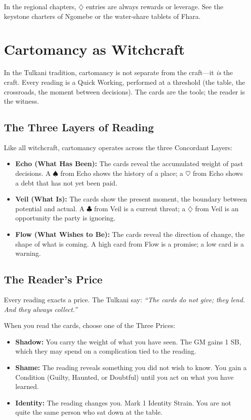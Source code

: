 \documentclass[11pt,letterpaper,twoside]{book}
\begin{document}
In the regional chapters, $\diamondsuit$ entries are always rewards or leverage. See the keystone charters of Ngomebe or the water-share tablets of Fhara.

\section*{Cartomancy as Witchcraft}

In the Tulkani tradition, cartomancy is not separate from the craft---it \textit{is} the craft. Every reading is a Quick Working, performed at a threshold (the table, the crossroads, the moment between decisions). The cards are the tools; the reader is the witness.

\subsection*{The Three Layers of Reading}

Like all witchcraft, cartomancy operates across the three Concordant Layers:

\begin{itemize}
    \item \textbf{Echo (What Has Been):} The cards reveal the accumulated weight of past decisions. A $\spadesuit$ from Echo shows the history of a place; a $\heartsuit$ from Echo shows a debt that has not yet been paid.
    \item \textbf{Veil (What Is):} The cards show the present moment, the boundary between potential and actual. A $\clubsuit$ from Veil is a current threat; a $\diamondsuit$ from Veil is an opportunity the party is ignoring.
    \item \textbf{Flow (What Wishes to Be):} The cards reveal the direction of change, the shape of what is coming. A high card from Flow is a promise; a low card is a warning.
\end{itemize}

\subsection*{The Reader's Price}

Every reading exacts a price. The Tulkani say: \textit{``The cards do not give; they lend. And they always collect.''}

When you read the cards, choose one of the Three Prices:

\begin{itemize}
    \item \textbf{Shadow:} You carry the weight of what you have seen. The GM gains 1 SB, which they may spend on a complication tied to the reading.
    \item \textbf{Shame:} The reading reveals something you did not wish to know. You gain a Condition (Guilty, Haunted, or Doubtful) until you act on what you have learned.
    \item \textbf{Identity:} The reading changes you. Mark 1 Identity Strain. You are not quite the same person who sat down at the table.
\end{itemize}
\end{document}

